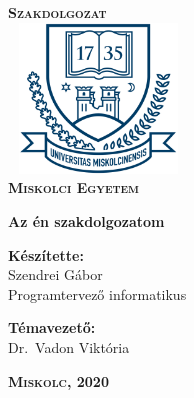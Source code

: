 \begin{titlepage}
\centering
\vspace*{2cm}
\huge\textsc{\textbf{Szakdolgozat}}\\[1cm]
\includegraphics[width=4.8cm, height=4cm,keepaspectratio]{images/me_logo.png}\\
\textbf{\textsc{Miskolci Egyetem}}

\vspace*{2cm}

{\LARGE\textbf{Az én szakdolgozatom}}

\vspace*{2cm}
\large
\textbf{Készítette:}\\[0.8ex]
Szendrei Gábor\\[0.8ex]
Programtervező informatikus

\vspace*{0.5cm}
\textbf{Témavezető:}\\[0.8ex]
Dr.\ Vadon Viktória

\vfill

\large
\textbf{\textsc{Miskolc, 2020}}

\end{titlepage}